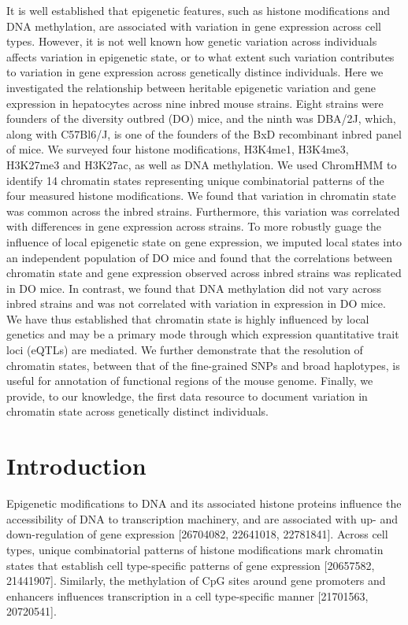 \documentclass[10pt,letterpaper]{article}
\begin{document}
It is well established that epigenetic features, such as histone
modifications and DNA methylation, are associated with variation in gene
expression across cell types. However, it is not well known how genetic
variation across individuals affects variation in epigenetic state, or
to what extent such variation contributes to variation in gene
expression across genetically distince individuals. Here we investigated
the relationship between heritable epigenetic variation and gene
expression in hepatocytes across nine inbred mouse strains. Eight
strains were founders of the diversity outbred (DO) mice, and the ninth
was DBA/2J, which, along with C57Bl6/J, is one of the founders of the
BxD recombinant inbred panel of mice. We surveyed four histone
modifications, H3K4me1, H3K4me3, H3K27me3 and H3K27ac, as well as DNA
methylation. We used ChromHMM to identify 14 chromatin states
representing unique combinatorial patterns of the four measured histone
modifications. We found that variation in chromatin state was common
across the inbred strains. Furthermore, this variation was correlated
with differences in gene expression across strains. To more robustly
guage the influence of local epigenetic state on gene expression, we
imputed local states into an independent population of DO mice and found
that the correlations between chromatin state and gene expression
observed across inbred strains was replicated in DO mice. In contrast,
we found that DNA methylation did not vary across inbred strains and was
not correlated with variation in expression in DO mice. We have thus
established that chromatin state is highly influenced by local genetics
and may be a primary mode through which expression quantitative trait
loci (eQTLs) are mediated. We further demonstrate that the resolution of
chromatin states, between that of the fine-grained SNPs and broad
haplotypes, is useful for annotation of functional regions of the mouse
genome. Finally, we provide, to our knowledge, the first data resource
to document variation in chromatin state across genetically distinct
individuals.

\hypertarget{introduction}{%
\section{Introduction}\label{introduction}}

Epigenetic modifications to DNA and its associated histone proteins
influence the accessibility of DNA to transcription machinery, and are
associated with up- and down-regulation of gene expression {[}26704082,
22641018, 22781841{]}. Across cell types, unique combinatorial patterns
of histone modifications mark chromatin states that establish cell
type-specific patterns of gene expression {[}20657582, 21441907{]}.
Similarly, the methylation of CpG sites around gene promoters and
enhancers influences transcription in a cell type-specific manner
{[}21701563, 20720541{]}.
\end{document}
